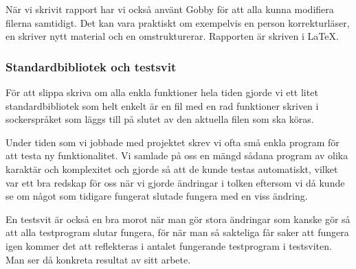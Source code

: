 \documentclass[../Appendix]{subfiles}
\begin{document}
    När vi skrivit rapport har vi också använt Gobby för att alla kunna
modifiera filerna samtidigt. Det kan vara praktiskt om exempelvis en person
korrekturläser, en skriver nytt material och en omstrukturerar. Rapporten 
är skriven i \LaTeX.

\subsubsection{Standardbibliotek och testsvit}

För att slippa skriva om alla enkla funktioner hela tiden gjorde vi ett litet standardbibliotek
som helt enkelt är en fil med en rad funktioner skriven i sockerspråket som läggs
till på slutet av den aktuella filen som ska köras.

Under tiden som vi jobbade med projektet skrev vi ofta små enkla
program för att testa ny funktionalitet. Vi samlade på oss en mängd sådana program av
olika karaktär och komplexitet och gjorde så att de kunde testas automatiskt, 
vilket var ett bra redskap för oss 
när vi gjorde ändringar i tolken eftersom vi då kunde se om något som tidigare
fungerat slutade fungera med en viss ändring. 

En testsvit är också en bra morot när man gör stora ändringar som kanske gör så att
alla testprogram slutar fungera, för när man så sakteliga får saker att fungera
igen kommer det att reflekteras i antalet fungerande testprogram i testsviten. 
Man ser då konkreta resultat av sitt arbete.



\end{document}

